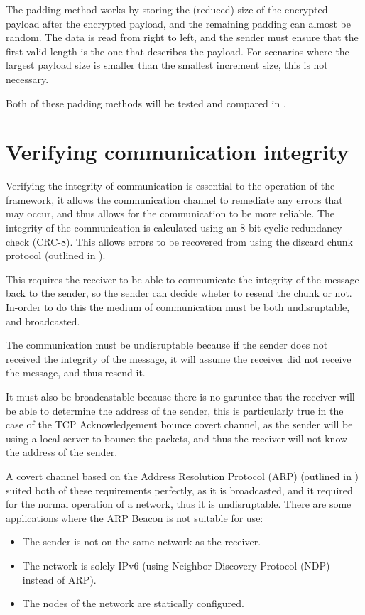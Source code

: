 The padding method works by storing the (reduced) size of the encrypted payload after the encrypted payload, and the remaining padding can almost be random. The data is read from right to left, and the sender must ensure that the first valid length is the one that describes the payload. For scenarios where the largest payload size is smaller than the smallest increment size, this is not necessary.

Both of these padding methods will be tested and compared in .

\section{Verifying communication integrity}
\label{sec:integrity}

Verifying the integrity of communication is essential to the operation of the framework, it allows the communication channel to remediate any errors that may occur, and thus allows for the communication to be more reliable. The integrity of the communication is calculated using an 8-bit cyclic redundancy check (CRC-8). This allows errors to be recovered from using the discard chunk protocol (outlined in ).

This requires the receiver to be able to communicate the integrity of the message back to the sender, so the sender can decide wheter to resend the chunk or not. In-order to do this the medium of communication must be both undisruptable, and broadcasted.

The communication must be undisruptable because if the sender does not received the integrity of the message, it will assume the receiver did not receive the message, and thus resend it.

It must also be broadcastable because there is no garuntee that the receiver will be able to determine the address of the sender, this is particularly true in the case of the TCP Acknowledgement bounce covert channel, as the sender will be using a local server to bounce the packets, and thus the receiver will not know the address of the sender.

A covert channel based on the Address Resolution Protocol (ARP) (outlined in ) suited both of these requirements perfectly, as it is broadcasted, and it required for the normal operation of a network, thus it is undisruptable. There are some applications where the ARP Beacon is not suitable for use:

\begin{itemize}
    \item The sender is not on the same network as the receiver.
    \item The network is solely IPv6 (using Neighbor Discovery Protocol (NDP) instead of ARP).
    \item The nodes of the network are statically configured.
\end{itemize}

